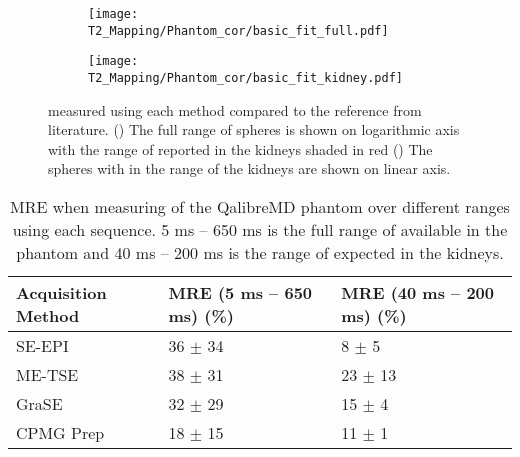 \begin{figure}[H]
	\centering
	\begin{subfigure}[c]{0.47\textwidth}
		\centering
		\texttt{[image: T2\_Mapping/Phantom\_cor/basic\_fit\_full.pdf]}
		\caption{}
		\label{fig:t2_phantom_cor_full}
	\end{subfigure}
	\hfill
	\begin{subfigure}[c]{0.47\textwidth}
		\centering
		\texttt{[image: T2\_Mapping/Phantom\_cor/basic\_fit\_kidney.pdf]}
		\caption{}
		\label{fig:t2_phantom_cor_kidney}
	\end{subfigure}
	\caption{\ttwo measured using each method compared to the reference \ttwo from literature. () The full range of \ttwo spheres is shown on logarithmic axis with the range of \ttwo reported in the kidneys shaded in red () The spheres with \ttwo in the range of the kidneys are shown on linear axis.}
	\label{fig:t2_phantom_cor}
\end{figure}

\begin{table}[H]
	\centering
	\begin{tabularx}{1\textwidth}{X|X|X}
		Acquisition   Method & MRE   (5 ms – 650 ms) (\%) & MRE   (40 ms – 200 ms) (\%) \\ \hline
		SE-EPI               & 36 $\pm$ 34                    & 8   $\pm$ 5                     \\ \hline
		ME-TSE               & 38   $\pm$ 31                  & 23 $\pm$ 13                     \\ \hline
		GraSE                & 32 $\pm$ 29                    & 15   $\pm$ 4                    \\ \hline
		CPMG   \ttwo Prep       & 18   $\pm$ 15                  & 11   $\pm$ 1                   
	\end{tabularx}
	\caption{\ac{MRE} when measuring \ttwo of the QalibreMD phantom over different ranges using each sequence. 5 ms – 650 ms is the full range of \ttwo available in the phantom and 40 ms – 200 ms is the range of \ttwo expected in the kidneys.}
	\label{tab:t2_phantom_acquisition_methods}
\end{table}

